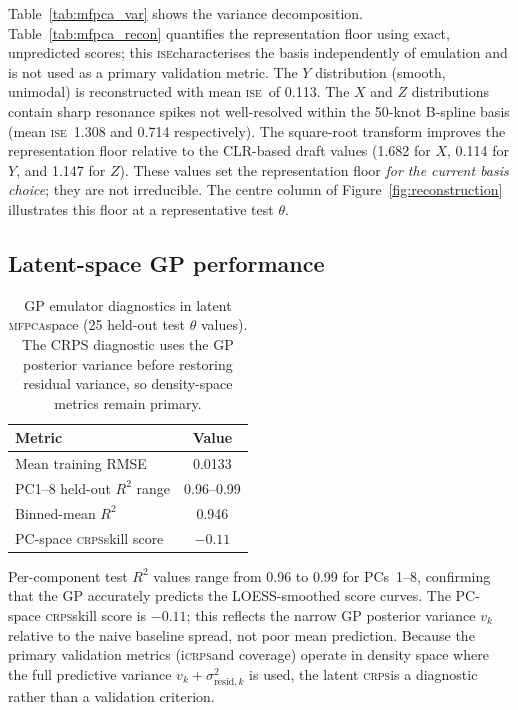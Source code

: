 \documentclass[12pt,a4paper]{article}
\newcommand{\MFPCA}{\textsc{mfpca}}
\newcommand{\ISE}{\textsc{ise}}
\newcommand{\CRPS}{\textsc{crps}}
\newcommand{\iCRPS}{i\textsc{crps}}
\newcommand{\spar}{\theta}
\begin{document}
Table~\ref{tab:mfpca_var} shows the variance decomposition.
Table~\ref{tab:mfpca_recon} quantifies the representation floor using
exact, unpredicted scores; this \ISE characterises the basis
independently of emulation and is not used as a primary validation
metric.  The $Y$ distribution (smooth, unimodal) is
reconstructed with mean \ISE\ of 0.113.  The $X$ and $Z$ distributions
contain sharp resonance spikes not well-resolved within the 50-knot
B-spline basis (mean \ISE\ 1.308 and 0.714 respectively).  The
square-root transform improves the representation floor relative to
the CLR-based draft values (1.682 for $X$, 0.114 for $Y$, and 1.147
for $Z$).  These values set the representation floor \emph{for the
current basis choice}; they are not irreducible.  The centre column of
Figure~\ref{fig:reconstruction} illustrates this floor at a
representative test $\spar$.

\subsection{Latent-space GP performance}
\label{sec:gp_results}

\begin{table}[htbp]
  \centering
  \caption{GP emulator diagnostics in latent \MFPCA space (25
           held-out test $\spar$ values).  The CRPS diagnostic uses
           the GP posterior variance before restoring residual variance,
           so density-space metrics remain primary.}
  \label{tab:gp_perf}
  \begin{tabular}{lc}
    \toprule
    Metric & Value \\
    \midrule
    Mean training RMSE                  & 0.0133 \\
    PC1--8 held-out $R^2$ range         & 0.96--0.99 \\
    Binned-mean $R^2$                   & 0.946 \\
    PC-space \CRPS skill score          & $-0.11$ \\
    \bottomrule
  \end{tabular}
\end{table}

Per-component test $R^2$ values range from 0.96 to 0.99 for
PCs~1--8, confirming that the GP accurately predicts the
LOESS-smoothed score curves.  The PC-space \CRPS skill score is
$-0.11$; this reflects the narrow GP posterior variance $v_k$ relative
to the naive baseline spread, not poor mean prediction.  Because the
primary validation metrics (\iCRPS and coverage) operate in density
space where the full predictive variance
$v_k+\sigma^2_{\mathrm{resid},k}$ is used, the latent \CRPS is a
diagnostic rather than a validation criterion.
\end{document}
